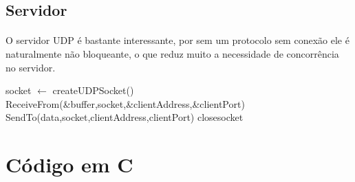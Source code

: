 \documentclass{article}
\newcommand*\Let[2]{\State #1 $\gets$ #2}
\begin{document}
\subsection{Servidor}
\paragraph{}O servidor UDP é bastante interessante, por sem um protocolo sem conexão ele é
naturalmente não bloqueante, o que reduz muito a necessidade de concorrência no servidor.
\begin{algorithm}
  \begin{algorithmic}[1]
    \Statex
    \Function{}{}
    \Let{socket}{createUDPSocket()} 
    \State ReceiveFrom(\&buffer,socket,\&clientAddress,\&clientPort)
    \State SendTo(data,socket,clientAddress,clientPort)
    \EndWhile
    \State close{socket}
      \EndFunction
  \end{algorithmic}
\end{algorithm}
\section{Código em C}
\end{document}
